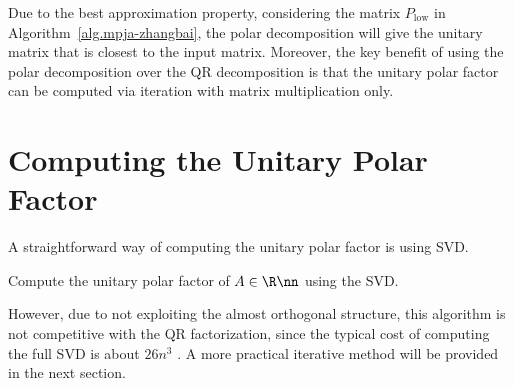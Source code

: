 \documentclass{article}
\numberwithin{equation}{section} %
\begin{document}
Due to the best approximation property, considering the matrix
$P_{\mathrm{low}}$ in Algorithm~\ref{alg.mpja-zhangbai}, the polar
decomposition  will give the unitary matrix that is closest to the input
matrix.
Moreover, the key benefit of using the polar decomposition over the QR
decomposition is that the unitary polar factor can be computed via
iteration with matrix multiplication only.

\section{Computing the Unitary Polar Factor}
\label{sec.comp-polar-decomp}

A straightforward way of computing the unitary polar factor is using SVD.
\begin{algorithm}
\caption{Compute the unitary polar factor of $A\in\R\nn$ using the SVD.}
\label{alg.polar-svd}
\begin{algorithmic}[1]
\end{algorithmic}
\end{algorithm}

However, due to not exploiting the almost orthogonal structure, this
algorithm is not competitive with the QR factorization, since the typical
cost of computing the full SVD is about $26n^{3}$ . A more practical iterative method will be provided
in the next section.
\end{document}
